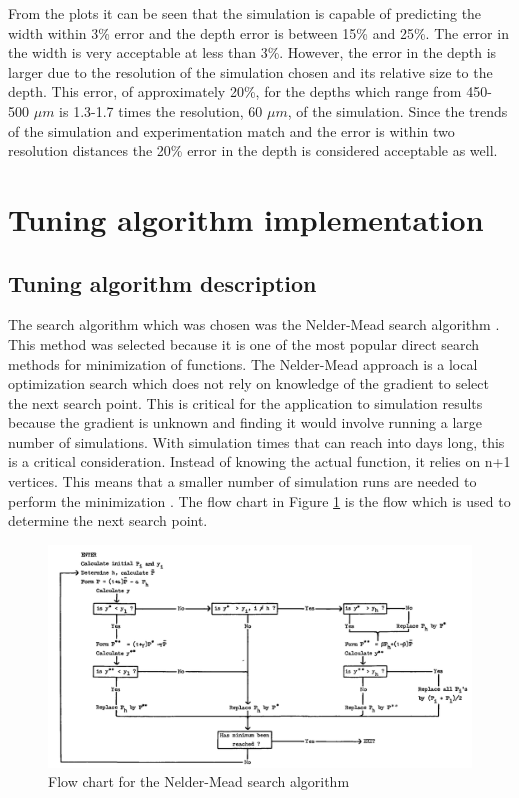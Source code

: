 \documentclass[pdflatex,sn-mathphys]{sn-jnl}
\begin{document}
	From the plots it can be seen that the simulation is capable of predicting the width within 3\% error and the depth error is between 15\% and 25\%.  The error in the width is very acceptable at less than 3\%.
	However, the error in the depth is larger due to the resolution of the simulation chosen and its relative size to the depth.  This error, of approximately 20\%, for the depths which range from 450-500 $\mu m$ is 1.3-1.7 times the resolution, 60 $\mu m$, of the simulation.  Since the trends of the simulation and experimentation match and the error is within two resolution distances the 20\% error in the depth is considered acceptable as well. 
	

\section{Tuning algorithm implementation}
	
	\subsection{Tuning algorithm description} \label{algrothim_description}

	The search algorithm which was chosen was the Nelder-Mead search algorithm \cite{nelder_1965}.  This method was selected because it is one of the most popular direct search methods for minimization of functions.  The Nelder-Mead approach is a local optimization search which does not rely on knowledge of the gradient to select the next search point.  This is critical for the application to simulation results because the gradient is unknown and finding it would involve running a large number of simulations.  With simulation times that can reach into days long, this is a critical consideration.  
	Instead of knowing the actual function, it relies on n+1 vertices.  This means that a smaller number of simulation runs are needed to perform the minimization \cite{wang_2011}.
	The flow chart in Figure \ref{fig:nm_flow} is the flow which is used to determine the next search point.
	\begin{figure}[!htb]
		\centering
		\includegraphics[width=\textwidth]{nm_flow}
		\caption{Flow chart for the Nelder-Mead search algorithm\cite{nelder_1965}}
		\label{fig:nm_flow}
	\end{figure}
	
\end{document}
